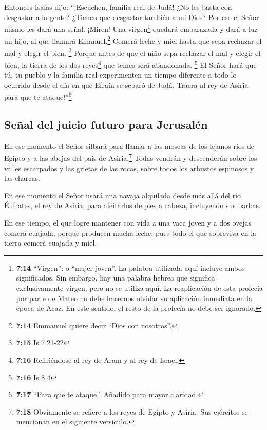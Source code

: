  Entonces Isaías dijo: ``¡Escuchen, familia real de Judá!
¿No les basta con desgastar a la gente? ¿Tienen que desgastar también a
mi Dios?  Por eso el Señor mismo les dará una señal.
¡Miren! Una virgen\footnote{\textbf{7:14} ``Virgen'': o ``mujer joven''.
  La palabra utilizada aquí incluye ambos significados. Sin embargo, hay
  una palabra hebrea que significa exclusivamente virgen, pero no se
  utiliza aquí. La reaplicación de esta profecía por parte de Mateo no
  debe hacernos olvidar su aplicación inmediata en la época de Acaz. En
  este sentido, el resto de la profecía no debe ser ignorado.} quedará
embarazada y dará a luz un hijo, al que llamará Emanuel.\footnote{\textbf{7:14}
  Emmanuel quiere decir ``Dios con nosotros''.}  Comerá
leche y miel hasta que sepa rechazar el mal y elegir el bien.
\footnote{\textbf{7:15} Is 7,21-22}  Porque antes de que
el niño sepa rechazar el mal y elegir el bien, la tierra de los dos
reyes\footnote{\textbf{7:16} Refiriéndose al rey de Aram y al rey de
  Israel.} que temes será abandonada. \footnote{\textbf{7:16} Is 8,4}
 El Señor hará que tú, tu pueblo y la familia real
experimenten un tiempo diferente a todo lo ocurrido desde el día en que
Efraín se separó de Judá. Traerá al rey de Asiria para que te
ataque!''\footnote{\textbf{7:17} ``Para que te ataque''. Añadido para
  mayor claridad.}

\hypertarget{seuxf1al-del-juicio-futuro-para-jerusaluxe9n}{%
\subsection{Señal del juicio futuro para
Jerusalén}\label{seuxf1al-del-juicio-futuro-para-jerusaluxe9n}}

 En ese momento el Señor silbará para llamar a las moscas
de los lejanos ríos de Egipto y a las abejas del país de
Asiria.\footnote{\textbf{7:18} Obviamente se refiere a los reyes de
  Egipto y Asiria. Sus ejércitos se mencionan en el siguiente versículo.}
 Todas vendrán y descenderán sobre los valles escarpados
y las grietas de las rocas, sobre todos los arbustos espinosos y las
charcas.

 En ese momento el Señor usará una navaja alquilada desde
más allá del río Éufrates, el rey de Asiria, para afeitarlos de pies a
cabeza, incluyendo sus barbas.

 En ese tiempo, el que logre mantener con vida a una vaca
joven y a dos ovejas  comerá cuajada, porque producen
mucha leche; pues todo el que sobreviva en la tierra comerá cuajada y
miel.

